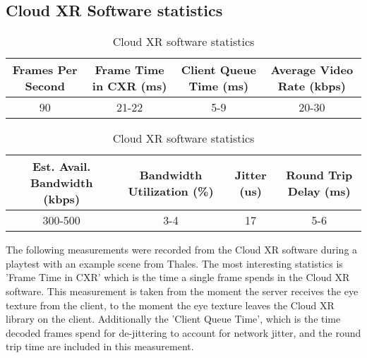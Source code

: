 \subsection{Cloud XR Software statistics}
\label{sec:res:t3}
\begin{table}[h!]
\begin{center}
\caption{Cloud XR software statistics}
\begin{tabular}{|c|c|c|c|}
\hline
Frames Per Second & Frame Time in CXR (\acrshort{ms}) & Client Queue Time (\acrshort{ms}) & Average Video Rate (kbps)  \\ \hline
90 & 21-22 & 5-9 & 20-30 \\ \hline
\end{tabular}
\begin{tabular}{|c|c|c|c|}
\hline
Est. Avail. Bandwidth (kbps) & Bandwidth Utilization (\%) & Jitter (\acrshort{us}) & Round Trip Delay (\acrshort{ms}) \\ \hline
300-500 & 3-4 & 17 & 5-6 \\ \hline
\end{tabular}
\end{center}
\end{table}

The following measurements were recorded from the Cloud XR software during a playtest with an example scene from Thales. The most interesting statistics is 'Frame Time in CXR' which is the time a single frame spends in the Cloud XR software. This measurement is taken from the moment the server receives the eye texture from the client, to the moment the eye texture leaves the Cloud XR library on the client. Additionally the 'Client Queue Time', which is the time decoded frames spend for de-jittering to account for network  jitter, and the round trip time are included in this measurement.